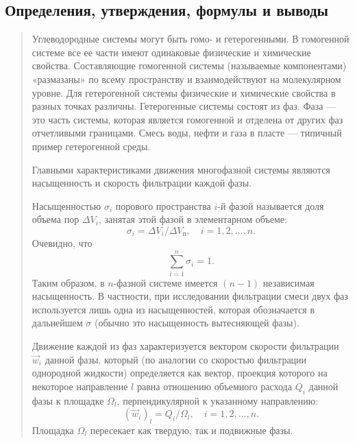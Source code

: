 \documentclass[12pt,a4paper]{article}
\begin{document}
\subsection*{Определения, утверждения, формулы и выводы}
\begingroup

\begin{quote}\sloppy
Углеводородные системы могут быть гомо- и гетерогенными. В гомогенной системе все ее части имеют одинаковые физические и химические свойства. Составляющие гомогенной системы (называемые компонентами) «размазаны» по всему пространству и взаимодействуют на молекулярном уровне. Для гетерогенной системы физические и химические свойства в разных точках различны. Гетерогенные системы состоят из фаз. Фаза --- это часть системы, которая является гомогенной и отделена от других фаз отчетливыми границами. Смесь воды, нефти и газа в пласте --- типичный пример гетерогенной среды.

Главными характеристиками движения многофазной системы являются насыщенность и скорость фильтрации каждой фазы.

Насыщенностью $\sigma_i$ порового пространства $i$-й фазой называется доля объема пор $\Delta V_i$, занятая этой фазой в элементарном объеме:
\begin{equation}\sigma_i=\Delta V_i/\Delta V_\text{п},\quad i=1,2,\ldots,n.\tag{9.1}\label{q10:eq-9-1}\end{equation}
Очевидно, что
\begin{equation}\sum_{i=1}^n\sigma_i=1.\tag{9.2}\label{q10:eq-9-2}\end{equation}
Таким образом, в $n$-фазной системе имеется $(n-1)$ независимая насыщенность. В частности, при исследовании фильтрации смеси двух фаз используется лишь одна из насыщенностей, которая обозначается в дальнейшем $\sigma$ (обычно это насыщенность вытесняющей фазы).

Движение каждой из фаз характеризуется вектором скорости фильтрации $\vec w_i$ данной фазы, который (по аналогии со скоростью фильтрации однородной жидкости) определяется как вектор, проекция которого на некоторое направление $l$ равна отношению объемного расхода $Q_i$ данной фазы к площадке $\Omega_l$, перпендикулярной к указанному направлению:
\begin{equation}(\vec w_i)_l=Q_i/\Omega_l,\quad i=1,2,\ldots,n.\tag{9.3}\label{q10:eq-9-3}\end{equation}
Площадка $\Omega_l$ пересекает как твердую, так и подвижные фазы.
\par\nobreak{}\par
\end{quote}
\end{document}
